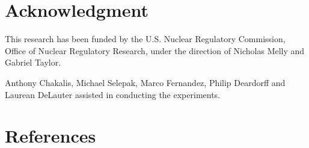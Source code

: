 \documentclass[12pt]{article}
\begin{document}
\section{Acknowledgment}

This research has been funded by the U.S. Nuclear Regulatory Commission, Office of Nuclear Regulatory Research, under the direction of Nicholas Melly and Gabriel Taylor.

Anthony Chakalis, Michael Selepak, Marco Fernandez, Philip Deardorff and Laurean DeLauter assisted in conducting the experiments.



\clearpage


\section*{References}


\end{document}
